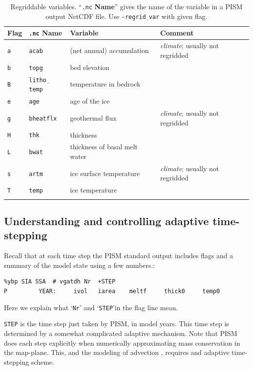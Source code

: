 \documentclass[11pt,final]{amsart}
\newcommand{\und}{$\underline{\,\,\,}$}
\begin{document}
\begin{table}[ht]
\caption{Regriddable variables.  ``\texttt{.nc} \textbf{Name}'' gives the name of the variable in a PISM output NetCDF file.  Use \texttt{-regrid$\underline{\phantom{b}}$var} with given flag.}\label{tab:regridvar}
\begin{tabular}{@{}llll}\hline
\textbf{Flag} & \texttt{.nc} \textbf{Name} & \textbf{Variable} & \textbf{Comment}\\ \hline
\verb|a| & \texttt{acab}       & (net annual) accumulation & \emph{climate}; usually not regridded \\
\verb|b| & \texttt{topg}       & bed elevation & \\
\verb|B| & \texttt{litho\und temp} & temperature in bedrock & \\
\verb|e| & \texttt{age}        & age of the ice & \\
\verb|g| & \texttt{bheatflx}   & geothermal flux & \emph{climate}; usually not regridded \\
\verb|H| & \texttt{thk}        & thickness & \\
\verb|L| & \texttt{bwat}       & thickness of basal melt water & \\
\verb|s| & \texttt{artm}       & ice surface temperature & \emph{climate}; usually not regridded\\
\verb|T| & \texttt{temp}       & ice temperature & \\
\hline
\normalsize
\end{tabular}
\end{table}


\subsection{Understanding and controlling adaptive time-stepping} \label{subsect:adapt} Recall that at each time step the PISM standard output includes flags and a summary of the model state using a few numbers.:
\begin{verbatim}
%ybp SIA SSA  # vgatdh Nr  +STEP
P         YEAR:     ivol   iarea    meltf     thick0     temp0
\end{verbatim}
Here we explain what `\verb|Nr|' and `\verb|STEP|'in the flag line mean.

\verb|STEP| is the time step just taken by PISM, in model years.  This time step is determined by a somewhat complicated adaptive mechanism.  Note that PISM does each step explicitly when numerically approximating mass conservation in the map-plane.  This, and the modeling of advection \cite{BBL}, requires and adaptive time-stepping scheme.
\end{document}
